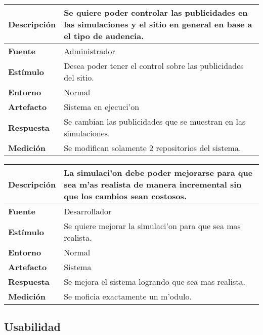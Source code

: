 \begin{center}
  \begin{tabular}{| l | p{10cm} | }
    \hline
  \textbf{Descripción} & Se quiere poder controlar las publicidades en las simulaciones y el sitio en general en base a el tipo de audencia.\\  \hline
  \textbf{Fuente} & Administrador\\  \hline
  \textbf{Estímulo} & Desea poder tener el control sobre las publicidades del sitio.\\  \hline
  \textbf{Entorno} & Normal\\  \hline
  \textbf{Artefacto} & Sistema en ejecuci'on\\  \hline
  \textbf{Respuesta} & Se cambian las publicidades que se muestran en las simulaciones.\\  \hline
  \textbf{Medición} & Se modifican solamente 2 repositorios del sistema.\\  \hline
  \end{tabular}
\end{center} 

\begin{center}
  \begin{tabular}{| l | p{10cm} | }
    \hline
  \textbf{Descripción} & La simulaci'on debe poder mejorarse para que sea m'as realista de manera incremental sin que los cambios sean costosos.\\  \hline
  \textbf{Fuente} & Desarrollador\\  \hline
  \textbf{Estímulo} & Se quiere mejorar la simulaci'on para que sea mas realista.\\  \hline
  \textbf{Entorno} & Normal\\  \hline
  \textbf{Artefacto} & Sistema\\  \hline
  \textbf{Respuesta} & Se mejora el sistema logrando que sea mas realista. \\  \hline
  \textbf{Medición} & Se moficia exactamente un m'odulo. \\  \hline
  \end{tabular}
\end{center} 



\subsection{Usabilidad}

